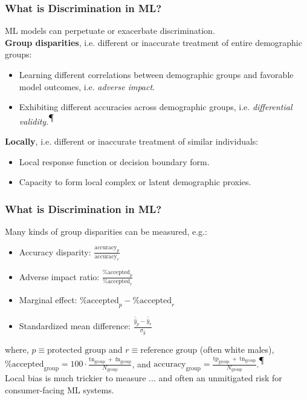 \documentclass[11pt,
               		aspectratio=169,
               		hyperref={colorlinks}
               		]{beamer}
\begin{document}
		\begin{frame}				
			\frametitle{What is Discrimination in ML?}
			ML models can perpetuate or exacerbate discrimination.\\
			\vspace{10pt}
			\noindent \textbf{Group disparities}, i.e. different or inaccurate treatment of entire demographic groups:\\
			\begin{itemize}
				\item Learning different correlations between demographic groups and favorable model outcomes, i.e. \textit{adverse impact}.
				\item Exhibiting different accuracies across demographic groups, i.e. \textit{differential validity}.\textsuperscript{$\mathparagraph$}
			\end{itemize}
			\vspace{5pt}
			\noindent \textbf{Locally}, i.e. different or inaccurate treatment of similar individuals:\\
			\begin{itemize}
				\item Local response function or decision boundary form. 
				\item Capacity to form local complex or latent demographic proxies.
			\end{itemize}
		\end{frame}
		\begin{frame}				
			\frametitle{What is Discrimination in ML?}
			Many kinds of group disparities can be measured, e.g.:\\
			\begin{itemize}
				\item Accuracy disparity: $\frac{\text{accuracy}_p}{\text{accuracy}_r}$
				\item Adverse impact ratio: $\frac{\text{\% accepted}_p }{ \text{\% accepted}_r}$
				\item Marginal effect: $\text{\% accepted}_p - \text{\% accepted}_r$
				\item Standardized mean difference: $\frac{\bar{\hat{y}}_p - \bar{\hat{y}}_r}{\sigma_{\hat{y}}}$
			\end{itemize}
			\noindent where, $p \equiv \text{protected group}$ and $r \equiv \text{reference group}$ (often white males),\\
			\vspace{5pt}
			$\text{\% accepted}_\text{group} = 100 \cdot \frac{\text{tn}_\text{group}~+~\text{fn}_\text{group}}{N_\text{group}}$, and $\text{accuracy}_\text{group} = \frac{\text{tp}_\text{group}~+~\text{tn}_\text{group}}{N_\text{group}}$.\textsuperscript{$\mathparagraph$}\\
			\vspace{10pt}
			Local bias is much trickier to measure ... and often an unmitigated risk for consumer-facing ML systems.
		\end{frame}		
\end{document}
